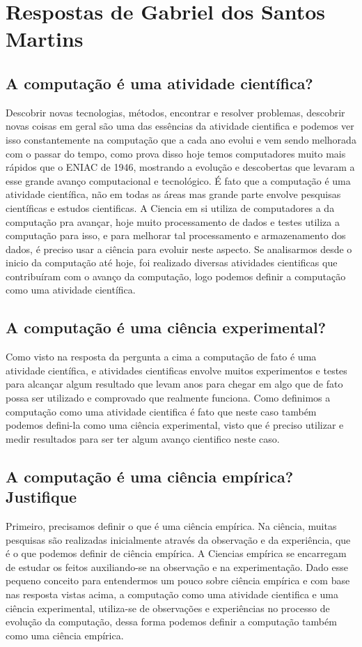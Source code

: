 \section{Respostas de Gabriel dos Santos Martins}

\subsection{A computação é uma atividade científica?}
Descobrir novas tecnologias, métodos, encontrar e resolver problemas, descobrir novas coisas em geral são uma das essências da atividade cientifica e podemos ver isso constantemente na computação que a cada ano evolui e vem sendo melhorada com o passar do tempo, como prova disso hoje temos computadores muito mais rápidos que o ENIAC de 1946, mostrando a evolução e descobertas que levaram a esse grande avanço computacional e tecnológico. É fato que a computação é uma atividade científica, não em todas as áreas mas grande parte envolve pesquisas científicas e estudos cientificas. A \gls{Ciencia} em si utiliza de computadores a da computação pra avançar, hoje muito processamento de dados e testes utiliza a computação para isso, e para melhorar tal processamento e armazenamento dos dados, é preciso usar a ciência para evoluir neste aspecto. 
Se analisarmos desde o inicio da computação até hoje, foi realizado diversas atividades cientificas que contribuíram com o avanço da computação, logo podemos definir a computação como uma atividade científica.

\subsection{A computação é uma ciência experimental?}
Como visto na resposta da pergunta a cima a computação de fato é uma atividade científica, e atividades cientificas envolve muitos experimentos e testes para alcançar algum resultado que levam anos para chegar em algo que de fato possa ser utilizado e comprovado que realmente funciona. Como definimos a computação como uma atividade cientifica é fato que neste caso também podemos defini-la como uma ciência experimental, visto que é preciso utilizar e medir resultados para ser ter algum avanço cientifico neste caso. 

\subsection{A computação é uma ciência empírica? Justifique}
Primeiro, precisamos definir o que é uma ciência empírica. Na ciência, muitas pesquisas são realizadas inicialmente através da observação e da experiência, que é o que podemos definir de ciência empírica. A \gls{Ciencias} empírica se encarregam de estudar os feitos auxiliando-se na observação e na experimentação. 
Dado esse pequeno conceito para entendermos um pouco sobre ciência empírica e com base nas resposta vistas acima, a computação como uma atividade cientifica e uma ciência experimental, utiliza-se de observações e experiências no processo de evolução da computação, dessa forma podemos definir a computação também como uma ciência empírica. 
